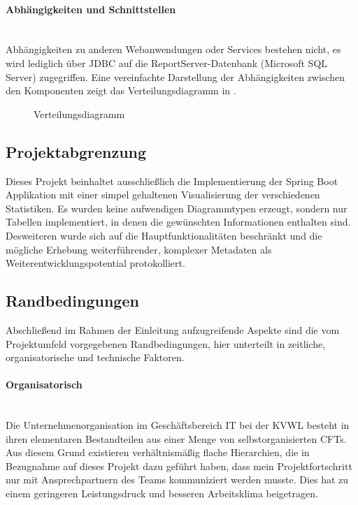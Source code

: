 \paragraph{Abhängigkeiten und Schnittstellen}~\\\label{p:Abhaengigkeiten}
Abhängigkeiten zu anderen Webanwendungen oder Services bestehen nicht, es wird lediglich über \ac{JDBC} auf die ReportServer-Datenbank (Microsoft SQL Server) zugegriffen. Eine vereinfachte Darstellung der Abhängigkeiten zwischen den Komponenten zeigt das Verteilungsdiagramm in .
\begin{figure}[htb]
	\centering
	\caption{Verteilungsdiagramm}
	\label{fig:Deployment}
\end{figure}

\subsection{Projektabgrenzung}\label{sec:Projektabgrenzung}
Dieses Projekt beinhaltet ausschließlich die Implementierung der Spring Boot Applikation mit einer simpel gehaltenen Visualisierung der verschiedenen Statistiken. Es wurden keine aufwendigen Diagrammtypen erzeugt, sondern nur Tabellen implementiert, in denen die gewünschten Informationen enthalten sind.
Desweiteren wurde sich auf die Hauptfunktionalitäten beschränkt und die mögliche Erhebung weiterführender, komplexer Metadaten als Weiterentwicklungspotential protokolliert.

\subsection{Randbedingungen}\label{sec:Randbedingungen}
Abschließend im Rahmen der Einleitung aufzugreifende Aspekte sind die vom Projektumfeld vorgegebenen Randbedingungen, hier unterteilt in zeitliche, organisatorische und technische Faktoren.

\paragraph{Organisatorisch}~\\\label{p:Randbedingungen:Organisatorisch}
Die Unternehmenorganisation im Geschäftsbereich IT bei der \ac{KVWL} besteht in ihren elementaren Bestandteilen aus einer Menge von selbstorganisierten \ac{CFT}s. Aus diesem Grund existieren verhältnismäßig flache Hierarchien, die in Bezugnahme auf dieses Projekt dazu geführt haben, dass mein Projektfortschritt nur mit Ansprechpartnern des Teams kommuniziert werden musste. Dies hat zu einem geringeren Leistungsdruck und besseren Arbeitsklima beigetragen.


